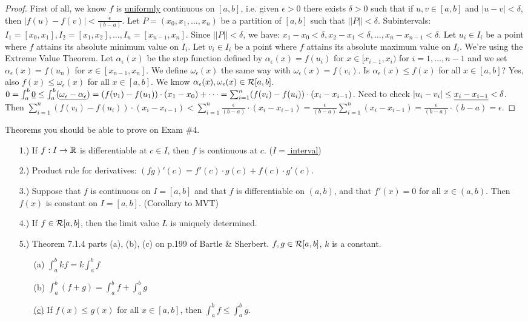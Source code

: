 \documentclass[]{article}
\begin{document}
\begin{proof}
	First of all, we know $f$ is \ul{uniformly} continuous on $[a,b]$, i.e. given \ul{$\epsilon>0$} there exists $\delta>0$ such that if $u,v\in[a,b]$ and $|u-v|<\delta$, then $|f(u) - f(v)| < \frac{\epsilon}{(b-a)}$. Let $P = (x_0,x_1,\dots,x_n)$ be a partition of $[a,b]$ such that $||P||<\delta$. Subintervals: $I_1 = [x_0,x_1], I_2 = [x_1,x_2], \dots, I_n = [x_{n-1},x_n]$. Since $||P||<\delta$, we have: $x_1-x_0<\delta, x_2-x_1<\delta, \dots, x_n-x_{n-1}<\delta$. Let $u_i \in I_i$ be a point where $f$ attains its absolute minimum value on $I_i$. Let $v_i \in I_i$ be a point where $f$ attains its absolute maximum value on $I_i$. We're using the Extreme Value Theorem. Let $\alpha_\epsilon(x)$ be the step function defined by $\alpha_\epsilon(x) = f(u_i)$ for $x\in[x_{i-1},x_i)$ for $i = 1,\dots, n-1$ and we set $\alpha_\epsilon(x) = f(u_n)$ for $x\in[x_{n-1},x_n]$. We define $\omega_\epsilon(x)$ the same way with $\omega_\epsilon(x) = f(v_i)$. Is $\alpha_\epsilon(x) \leq f(x)$ for all $x\in[a,b]$? Yes, also $f(x) \leq \omega_\epsilon(x)$ for all $x\in[a,b]$. We know $\alpha_\epsilon(x),\omega_\epsilon(x)\in\mathcal{R}[a,b]$. $0 = \int_a^b \underline{0} \leq \int_a^b (\underline{\omega_\epsilon - \alpha_\epsilon}) = (f(v_1) - f(u_1))\cdot(x_1 - x_0) + \dots = \sum_{i=1}^n (f(v_i)-f(u_i))\cdot(x_i-x_{i-1})$. Need to check $|u_i-v_i| \leq \underline{x_i - x_{i-1}} < \delta$. Then $\sum_{i=1}^n (f(v_i)-f(u_i))\cdot (x_i - x_{i-1}) < \sum_{i=1}^n \frac{\epsilon}{(b-a)} \cdot (x_i - x_{i-1}) = \frac{\epsilon}{(b-a)} \sum_{i=1}^n (x_i - x_{i-1}) = \frac{\epsilon}{(b-a)} \cdot (b-a) = \epsilon$.
\end{proof}

Theorems you should be able to prove on Exam \#4.
\begin{enumerate}
	\item[1.)] If $f:I\rightarrow\mathbb{R}$ is differentiable at \ul{$c\in I$}, then $f$ is continuous at $c$. (\ul{$I = $ interval})
	\item[2.)] Product rule for derivatives: $(fg)'(c) = f'(c)\cdot g(c) + f(c)\cdot g'(c)$.
	\item[3.)] Suppose that $f$ is continuous on $I = [a,b]$ and that $f$ is differentiable on $(a,b)$, and that $f'(x) = 0$ for all $x\in(a,b)$. Then $f(x)$ is constant on $I = [a,b]$. (Corollary to MVT)
	\item[4.)] If $f\in\mathcal{R}[a,b]$, then the limit value $L$ is uniquely determined.
	\item[5.)] Theorem 7.1.4 parts (a), (b), (c) on p.199 of Bartle \& Sherbert. $f,g\in\mathcal{R}[a,b]$, $k$ is a constant.
	\begin{enumerate}
		\item[(a)] $\int_a^b kf = k\int_a^b f$
		\item[(b)] $\int_a^b(f+g) = \int_a^bf + \int_a^b g$
		\item[\ul{(c)}] If $f(x) \leq g(x)$ for all $x\in[a,b]$, then $\int_a^b f\leq \int_a^b g$.
	\end{enumerate}
\end{enumerate}
\end{document}
